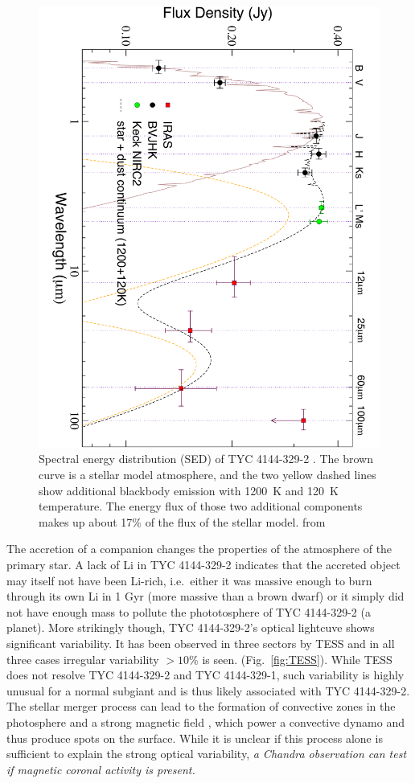 \documentclass[letterpaper,11pt]{article}
\begin{document}
\begin{figure}
\includegraphics[width=.5\textwidth]{SED}
\caption{Spectral energy distribution (SED) of TYC 4144-329-2 . The brown curve is a stellar model atmosphere, and the two yellow dashed lines show additional blackbody emission with 1200~K and 120~K temperature. The energy flux of those two additional components makes up about 17\% of the flux of the stellar model. from \cite{2009ApJ...696.1964M} }
\label{fig:SED}
\end{figure}


The accretion of a companion changes the properties of the atmosphere of the primary star. A lack of Li in TYC 4144-329-2 \cite{2009ApJ...696.1964M} indicates that the accreted object may itself not have been Li-rich, i.e.\ either it was massive enough to burn through its own Li in 1 Gyr (more massive than a brown dwarf) or it simply did not have enough mass to pollute the phototosphere of TYC 4144-329-2 (a planet). More strikingly though, TYC 4144-329-2's optical lightcuve shows significant variability. It has been observed in three sectors by TESS and in all three cases irregular variability $>10\%$ is seen. (Fig.~\ref{fig:TESS}). While TESS does not resolve TYC 4144-329-2 and TYC 4144-329-1, such variability is highly unusual for a normal subgiant and is thus likely associated with TYC 4144-329-2. The stellar merger process can lead to the formation of convective zones in the photosphere \cite{Soker&Tylenda2007} and a strong magnetic field \cite{Schneider+2016}, which power a convective dynamo and thus produce spots on the surface. While it is unclear if this process alone is sufficient to explain the strong optical variability, \textit{a Chandra observation can test if magnetic coronal activity is present.}
\end{document}
